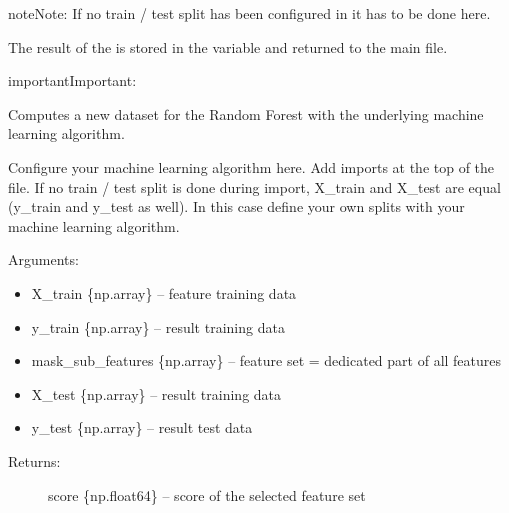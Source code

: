 \documentclass[letterpaper,10pt,english]{sphinxmanual}
\begin{document}
\begin{sphinxadmonition}{note}{Note:}
If no train / test split has been configured in {\hyperref[\detokenize{Importing_Data:import-data}]{}} it has to be done here.
\end{sphinxadmonition}

The result of the {\hyperref[\detokenize{Overview:mla}]{}} is stored in the variable  and returned to the main file.

\begin{sphinxadmonition}{important}{Important:}

\begin{fulllineitems}
\label{\detokenize{Generate_Database:ForestFire.compute.compute}}
Computes a new dataset for the Random Forest with the underlying machine learning algorithm.

Configure your machine learning algorithm here.
Add imports at the top of the file.
If no train / test split is done during import, X\_train and X\_test are equal (y\_train and y\_test as well).
In this case define your own splits with your machine learning algorithm.

Arguments:
\begin{itemize}
\item {} 
X\_train \{np.array\} -- feature training data

\item {} 
y\_train \{np.array\} -- result training data

\item {} 
mask\_sub\_features \{np.array\} -- feature set = dedicated part of all features

\item {} 
X\_test \{np.array\} -- result training data

\item {} 
y\_test \{np.array\} -- result test data

\end{itemize}
\begin{description}
\item[{Returns:}] \leavevmode
score \{np.float64\} -- score of the selected feature set


\end{description}
\end{fulllineitems}
\end{sphinxadmonition}
\end{document}
